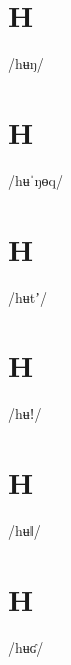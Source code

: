 \documentclass[10pt,a4paper,twoside]{book}
\begin{document}
\section*{H}

\begin{multicols}{3}
 {/hʉŋ/} {}
\end{multicols}

\section*{H}

\begin{multicols}{3}
 {/hʉˈŋɵq/} {}
\end{multicols}

\section*{H}

\begin{multicols}{3}
 {/hʉtʼ/} {}
\end{multicols}

\section*{H}

\begin{multicols}{3}
 {/hʉǃ/} {}
\end{multicols}

\section*{H}

\begin{multicols}{3}
 {/hʉǁ/} {}
\end{multicols}

\section*{H}

\begin{multicols}{3}
 {/hʉʛ/} {}
\end{multicols}
\end{document}
